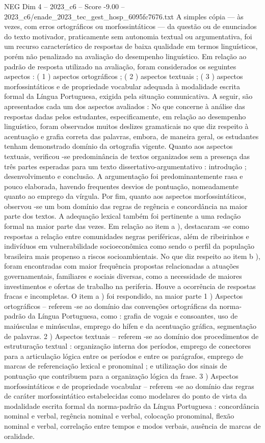 \begin{textsample}{NEG Dim 4 – 2023\_c6 – Score -9.00 – 2023\_c6/enade\_2023\_tec\_gest\_hosp\_6095fc7676.txt}
A simples cópia — às vezes, com erros ortográficos ou morfossintáticos — da questão ou de enunciados do texto motivador, praticamente sem autonomia textual ou argumentativa, foi um recurso característico de respostas de baixa qualidade em termos linguísticos, porém não penalizado na avaliação do desempenho linguístico.
Em relação ao padrão de resposta utilizado na avaliação, foram considerados os seguintes aspectos : ( 1 ) aspectos ortográficos ; ( 2 ) aspectos textuais ; ( 3 ) aspectos morfossintáticos e de propriedade vocabular adequada à modalidade escrita formal da Língua Portuguesa, exigida pela situação comunicativa.
A seguir, são apresentados cada um dos aspectos avaliados : No que concerne à análise das respostas dadas pelos estudantes, especificamente, em relação ao desempenho linguístico, foram observados muitos deslizes gramaticais no que diz respeito à acentuação e grafia correta das palavras, embora, de maneira geral, os estudantes tenham demonstrado domínio da ortografia vigente.
Quanto aos aspectos textuais, verificou -se predominância de textos organizados sem a presença das três partes esperadas para um texto dissertativo-argumentativo : introdução ; desenvolvimento e conclusão.
A argumentação foi predominantemente rasa e pouco elaborada, havendo frequentes desvios de pontuação, nomeadamente quanto ao emprego da vírgula.
Por fim, quanto aos aspectos morfossintáticos, observou -se um bom domínio das regras de regência e concordância na maior parte dos textos.
A adequação lexical também foi pertinente a uma redação formal na maior parte das vezes.
Em relação ao item a ), destacaram -se como respostas a relação entre comunidades negras periféricas, além de ribeirinhos e indivíduos em vulnerabilidade socioeconômica como sendo o perfil da população brasileira mais propenso a riscos socioambientais.
No que diz respeito ao item b ), foram encontradas com maior frequência propostas relacionadas a atuações governamentais, familiares e sociais diversas, como a necessidade de maiores investimentos e ofertas de trabalho na periferia.
Houve a ocorrência de respostas fracas e incompletas.
O item a ) foi respondido, na maior parte 1 ) Aspectos ortográficos – referem -se ao domínio das convenções ortográficas da norma-padrão da Língua Portuguesa, como : grafia de vogais e consoantes, uso de maiúsculas e minúsculas, emprego do hífen e da acentuação gráfica, segmentação de palavras. 2 ) Aspectos textuais – referem -se ao domínio dos procedimentos de estruturação textual : organização interna dos períodos, emprego de conectores para a articulação lógica entre os períodos e entre os parágrafos, emprego de marcas de referenciação lexical e pronominal ; e utilização dos sinais de pontuação que contribuem para a organização lógica da frase. 3 ) Aspectos morfossintáticos e de propriedade vocabular – referem -se ao domínio das regras de caráter morfossintático estabelecidas como modelares do ponto de vista da modalidade escrita formal da norma-padrão da Língua Portuguesa : concordância nominal e verbal, regência nominal e verbal, colocação pronominal, flexão nominal e verbal, correlação entre tempos e modos verbais, ausência de marcas de oralidade.

\end{textsample}
